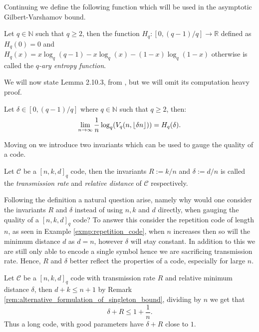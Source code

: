 Continuing we define the following function which will be used in the asymptotic Gilbert-Varshamov bound.
\begin{definition}
  Let $q \in \mathbb{N}$ such that $q \geq 2$, then the function $H_q: [0, (q - 1)/q] \to \mathbb{R}$ defined as $H_q(0) = 0$ and $H_q(x) = x \log_{q}(q-1) - x \log_{q}(x) - (1-x)\log_q(1 - x)$ otherwise is called the \textit{$q$-ary entropy function}.
\end{definition}
We will now state Lemma 2.10.3, from \cite{huffman}, but we will omit its computation heavy proof.
\begin{lemma}\label{lem:entropy_limit}
  Let $\delta \in [0, (q - 1) / q]$ where $q \in \mathbb{N}$ such that $q \geq 2$, then:
  \begin{equation*}
    \lim_{n \to \infty} \frac{1}{n} \log_q(V_q(n, \lfloor\delta n\rfloor)) = H_q(\delta).
  \end{equation*}
\end{lemma}

Moving on we introduce two invariants which can be used to gauge the quality of a code.
\begin{definition}
Let $\mathcal{C}$ be a $[n, k, d]_q$ code, then the invariants $R := k / n$ and $\delta := d / n$ is called the \textit{transmission rate} and \textit{relative distance} of $\mathcal{C}$ respectively.
\end{definition}
Following the definition a natural question arise, namely why would one consider the invariants $R$ and $\delta$ instead of using $n, k$ and $d$ directly, when gauging the quality of a $[n,k,d]_q$ code?
To answer this consider the repetition code of length $n$, as seen in Example \ref{exmp:repetition_code}, when $n$ increases then so will the minimum distance $d$ as $d = n$, however $\delta$ will stay constant.
In addition to this we are still only able to encode a single symbol hence we are sacrificing transmission rate. Hence, $R$ and $\delta$ better reflect the properties of a code, especially for large $n$.

\begin{remark}\label{rem:upper_bound_of_sum}
  Let $\mathcal{C}$ be a $[n, k, d]_{q}$ code with transmission rate $R$ and relative minimum distance $\delta$, then $d + k \leq n + 1$ by Remark \ref{rem:alternative_formulation_of_singleton_bound}, dividing by $n$ we get that
  \begin{equation*}
    \delta + R \leq 1 + \frac{1}{n}.
  \end{equation*}
  Thus a long code, with good parameters have $\delta + R$ close to $1$.
\end{remark}

